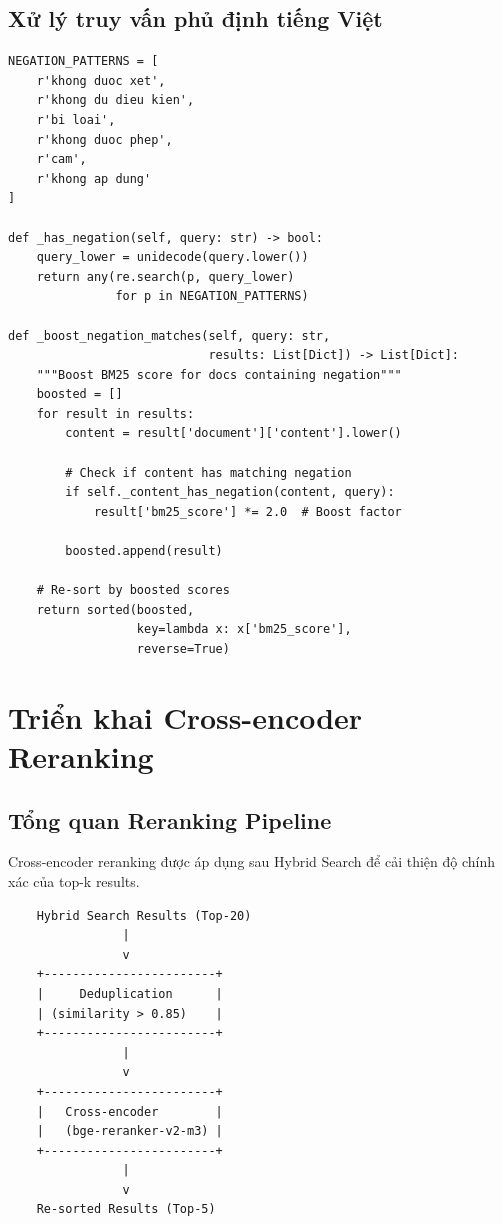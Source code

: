 \documentclass[../DoAn.tex]{subfiles}
\begin{document}
\subsection{Xử lý truy vấn phủ định tiếng Việt}
\begin{verbatim}
NEGATION_PATTERNS = [
    r'khong duoc xet',
    r'khong du dieu kien', 
    r'bi loai',
    r'khong duoc phep',
    r'cam',
    r'khong ap dung'
]

def _has_negation(self, query: str) -> bool:
    query_lower = unidecode(query.lower())
    return any(re.search(p, query_lower) 
               for p in NEGATION_PATTERNS)

def _boost_negation_matches(self, query: str, 
                            results: List[Dict]) -> List[Dict]:
    """Boost BM25 score for docs containing negation"""
    boosted = []
    for result in results:
        content = result['document']['content'].lower()
        
        # Check if content has matching negation
        if self._content_has_negation(content, query):
            result['bm25_score'] *= 2.0  # Boost factor
        
        boosted.append(result)
    
    # Re-sort by boosted scores
    return sorted(boosted, 
                  key=lambda x: x['bm25_score'], 
                  reverse=True)
\end{verbatim}

\section{Triển khai Cross-encoder Reranking}

\subsection{Tổng quan Reranking Pipeline}
Cross-encoder reranking được áp dụng sau Hybrid Search để cải thiện độ chính xác của top-k results.

\begin{verbatim}
    Hybrid Search Results (Top-20)
                |
                v
    +------------------------+
    |     Deduplication      |
    | (similarity > 0.85)    |
    +------------------------+
                |
                v
    +------------------------+
    |   Cross-encoder        |
    |   (bge-reranker-v2-m3) |
    +------------------------+
                |
                v
    Re-sorted Results (Top-5)
\end{verbatim}
\end{document}
